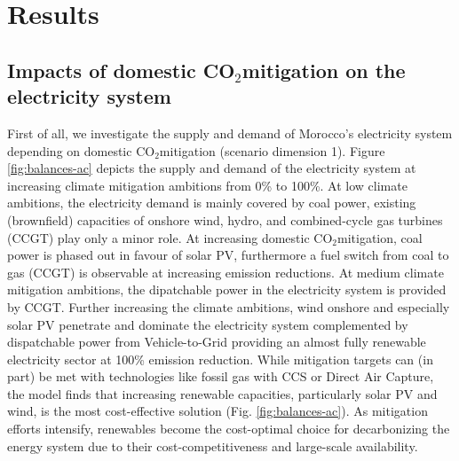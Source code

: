 \documentclass[5p,numafflabel]{elsarticle}
\newcommand{\co}{\ce{CO2}~}
\def\co{CO${}_2${\:}}
\begin{document}

% 



\section*{Results}
\label{sec:results}





\subsection*{Impacts of domestic \co mitigation on the electricity system}
\label{subsec:increase_limit}
First of all, we investigate the supply and demand of Morocco's electricity system depending on domestic \co mitigation (scenario dimension 1). Figure \ref{fig:balances-ac} depicts the supply and demand of the electricity system at increasing climate mitigation ambitions from 0\% to 100\%. At low climate ambitions, the electricity demand is mainly covered by coal power, existing (brownfield) capacities of onshore wind, hydro, and combined-cycle gas turbines (CCGT) play only a minor role. 
At increasing domestic \co mitigation, coal power is phased out in favour of solar PV, furthermore a fuel switch from coal to gas (CCGT) is observable at increasing emission reductions. At medium climate mitigation ambitions, the dipatchable power in the electricity system is provided by CCGT. 
Further increasing the climate ambitions, wind onshore and especially solar PV penetrate and dominate the electricity system complemented by dispatchable power from Vehicle-to-Grid providing an almost fully renewable electricity sector at 100\% emission reduction. 
While mitigation targets can (in part) be met with technologies like fossil gas with CCS or Direct Air Capture, the model finds that increasing renewable capacities, particularly solar PV and wind, is the most cost-effective solution (Fig. \ref{fig:balances-ac}). As mitigation efforts intensify, renewables become the cost-optimal choice for decarbonizing the energy system due to their cost-competitiveness and large-scale availability.
\end{document}
